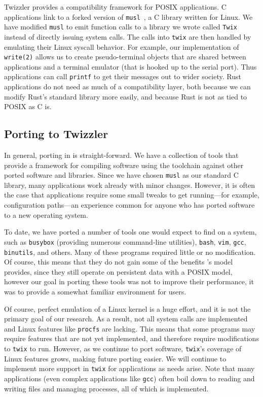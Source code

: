 Twizzler provides a compatibility framework for POSIX applications. C applications link to a forked version of \texttt{musl}~\cite{musl}, a
C library written for Linux. We have modified \texttt{musl} to emit function calls to a library we wrote called
\texttt{Twix} instead of directly issuing system calls. The calls into \texttt{twix} are then handled by emulating their
Linux syscall behavior. For example, our implementation of \texttt{write(2)} allows us to create pseudo-terminal objects
that are shared between applications and a terminal emulator (that is hooked up to the serial port). Thus applications
can call \texttt{printf} to get their messages out to wider society. Rust applications do not need as much of a compatibility layer, both because we can modify
Rust's standard library more easily, and because Rust is not as tied to POSIX as C is.

\subsection{Porting to Twizzler}

In general, porting in \Twizzler is straight-forward. We have a collection of tools that provide a
framework for compiling software using the \Twizzler toolchain against other ported software and
libraries. Since we have chosen \texttt{musl} as our standard C library, many applications work
already with minor changes. However, it is often the case that applications require
some small tweaks to get running---for example, configuration paths---an experience common for anyone who has ported software to a new
operating system.

To date, we have ported a number of tools one would expect to find on a \unix system, such as
\texttt{busybox} (providing numerous command-line utilities), \texttt{bash}, \texttt{vim},
\texttt{gcc}, \texttt{binutils}, and others. Many of these programs required little or no
modification. Of course, this means that they do not gain some of the benefits \Twizzler's model
provides, since they still operate on persistent data with a POSIX model, however our goal in
porting these tools was not to improve their performance, it was to provide a somewhat familiar
environment for users.

Of course, perfect emulation of a Linux kernel is a huge effort, and it is not the primary goal of
our research. As a result, not all system calls are implemented and Linux features like
\texttt{procfs} are lacking. This means that some programs may require features that are not yet
implemented, and therefore require modifications to \texttt{twix} to run. However, as we continue to
port software, \texttt{twix}'s coverage of Linux features grows, making future porting easier. We
will continue to implement more support in \texttt{twix} for applications as needs arise. Note that
many applications (even complex applications like \texttt{gcc}) often boil down to reading and
writing files and managing processes, all of which is implemented.

